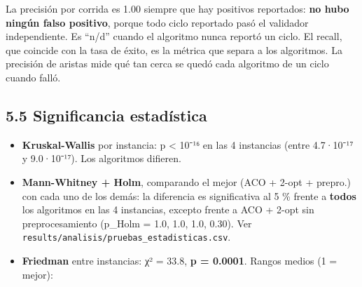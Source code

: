 \documentclass[
  spanish,
  12pt,
]{article}
\providecommand{\tightlist}{%
  \setlength{\itemsep}{0pt}\setlength{\parskip}{0pt}}
\begin{document}
La precisión por corrida es 1.00 siempre que hay positivos reportados:
\textbf{no hubo ningún falso positivo}, porque todo ciclo reportado pasó
el validador independiente. Es ``n/d'' cuando el algoritmo nunca reportó
un ciclo. El recall, que coincide con la tasa de éxito, es la métrica
que separa a los algoritmos. La precisión de aristas mide qué tan cerca
se quedó cada algoritmo de un ciclo cuando falló.

\subsection{5.5 Significancia
estadística}\label{significancia-estaduxedstica}

\begin{itemize}
\tightlist
\item
  \textbf{Kruskal-Wallis} por instancia: p \textless{} 10⁻¹⁶ en las 4
  instancias (entre 4.7·10⁻¹⁷ y 9.0·10⁻¹⁷). Los algoritmos difieren.
\item
  \textbf{Mann-Whitney + Holm}, comparando el mejor (ACO + 2-opt +
  prepro.) con cada uno de los demás: la diferencia es significativa al
  5 \% frente a \textbf{todos} los algoritmos en las 4 instancias,
  excepto frente a ACO + 2-opt sin preprocesamiento (p\_Holm = 1.0, 1.0,
  1.0, 0.30). Ver \texttt{results/analisis/pruebas\_estadisticas.csv}.
\item
  \textbf{Friedman} entre instancias: χ² = 33.8, \textbf{p = 0.0001}.
  Rangos medios (1 = mejor):
\end{itemize}
\end{document}
